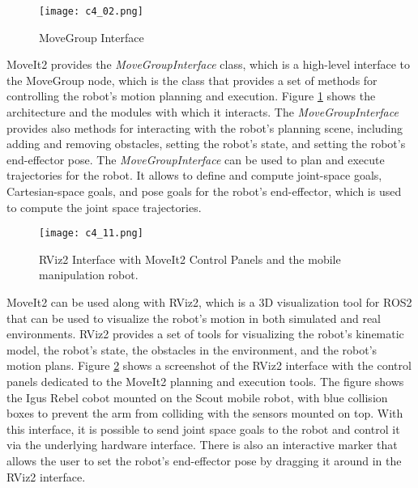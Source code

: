 \begin{figure}[t]
    \centering
    \texttt{[image: c4\_02.png]}
    \caption{MoveGroup Interface}
    \label{fig:move_group}
\end{figure}

MoveIt2 provides the \textit{MoveGroupInterface} class, which is a high-level interface to the MoveGroup node, which is the
class that provides a set of methods for controlling the robot's motion planning and execution. 
Figure \ref{fig:move_group} shows the architecture and the modules with which it interacts.
The \textit{MoveGroupInterface} provides also methods for interacting with the robot's planning scene, 
including adding and removing obstacles, setting the robot's state, and setting the robot's end-effector pose. 
The \textit{MoveGroupInterface} can be used to plan and execute trajectories for the robot. 
It allows to define and compute joint-space goals, Cartesian-space goals,
and pose goals for the robot's end-effector, which is used to compute the joint space trajectories.

\begin{figure}[t]
    \centering
    \texttt{[image: c4\_11.png]}
    \caption{RViz2 Interface with MoveIt2 Control Panels and the mobile manipulation robot.}
    \label{fig:rviz2}
\end{figure}


MoveIt2 can be used along with RViz2, which is a 3D visualization tool for ROS2 that can be used to visualize the
robot's motion in both simulated and real environments. RViz2 provides a set of tools for visualizing the robot's
kinematic model, the robot's state, the obstacles in the environment, and the robot's motion plans.
Figure \ref{fig:rviz2} shows a screenshot of the RViz2 interface with the control panels dedicated to the MoveIt2
planning and execution tools. The figure shows the Igus Rebel cobot mounted on the Scout mobile robot,
with blue collision boxes to prevent the arm from colliding with the sensors mounted on top.
With this interface, it is possible to send joint space goals to the robot
and control it via the underlying hardware interface. There is also an interactive marker that allows the user
to set the robot's end-effector pose by dragging it around in the RViz2 interface.

